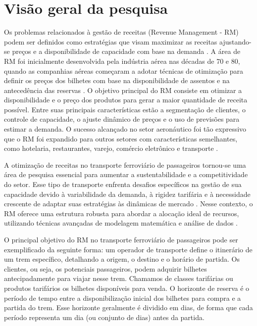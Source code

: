 \section{Visão geral da pesquisa}

Os problemas relacionados à gestão de receitas (Revenue Management - RM) podem ser definidos como estratégias que visam maximizar as receitas ajustando-se preços e a disponibilidade de capacidade com base na demanda \citep{Gallego1994}. A área de RM foi inicialmente desenvolvida pela indústria aérea nas décadas de 70 e 80, quando as companhias aéreas começaram a adotar técnicas de otimização para definir os preços dos bilhetes com base na disponibilidade de assentos e na antecedência das reservas \citep{article_base}. O objetivo principal do RM consiste em otimizar a disponibilidade e o preço dos produtos para gerar a maior quantidade de receita possível. Entre suas principais características estão a segmentação de clientes, o controle de capacidade, o ajuste dinâmico de preços e o uso de previsões para estimar a demanda. O sucesso alcançado no setor aeronáutico foi tão expressivo que o RM foi expandido para outros setores com características semelhantes, como hotelaria, restaurantes, varejo, comércio eletrônico e transporte \citep{HEO2009446}.

A otimização de receitas no transporte ferroviário de passageiros tornou-se uma área de pesquisa essencial para aumentar a sustentabilidade e a competitividade do setor. Esse tipo de transporte enfrenta desafios específicos na gestão de sua capacidade devido à variabilidade da demanda, à rigidez tarifária e à necessidade crescente de adaptar suas estratégias às dinâmicas de mercado \citep{Guerriero2021}. Nesse contexto, o RM oferece uma estrutura robusta para abordar a alocação ideal de recursos, utilizando técnicas avançadas de modelagem matemática e análise de dados \citep{Ammirato2020}.

O principal objetivo do RM no transporte ferroviário de passageiros pode ser exemplificado da seguinte forma: um operador de transporte define o itinerário de um trem específico, detalhando a origem, o destino e o horário de partida. Os clientes, ou seja, os potenciais passageiros, podem adquirir bilhetes antecipadamente para viajar nesse trem. Chamamos de classes tarifárias ou produtos tarifários os bilhetes disponíveis para venda. O horizonte de reserva é o período de tempo entre a disponibilização inicial dos bilhetes para compra e a partida do trem. Esse horizonte geralmente é dividido em dias, de forma que cada período representa um dia (ou conjunto de dias) antes da partida.

